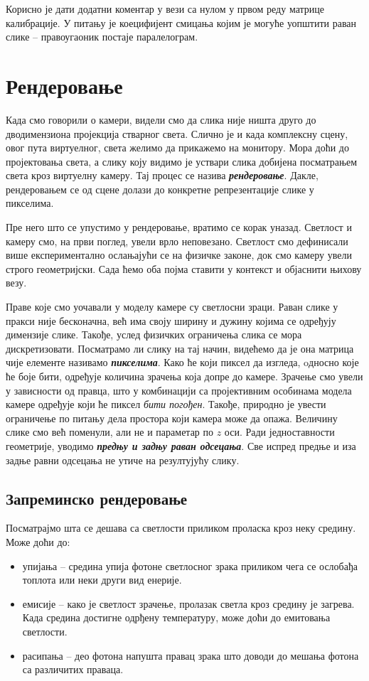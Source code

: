 \documentclass[12pt, a4paper, twoside]{book}
\numberwithin{equation}{chapter}
\numberwithin{theorem}{section}
\numberwithin{definition}{section}
\numberwithin{definitionChapter}{chapter}
\begin{document}
	Корисно је дати додатни коментар у вези са нулом у првом реду матрице калибрације. У питању је коецифијент
	смицања којим је могуће уопштити раван слике -- правоугаоник постаје паралелограм.

\section{Рендеровање}
Када смо говорили о камери, видели смо да слика није ништа друго до дводимензиона пројекција стварног света.
Слично је и када комплексну сцену, овог пута виртуелног, света желимо да прикажемо на монитору. Мора доћи
до пројектовања света, а слику коју видимо је уствари слика добијена посматрањем света кроз виртуелну камеру.
Тај процес се назива \textbf{\textit{рендеровање}}. Дакле, рендеровањем се од сцене долази до конкретне
репрезентације слике у пикселима.

Пре него што се упустимо у рендеровање, вратимо се корак уназад. Светлост и камеру смо, на први поглед, увели
врло неповезано. Светлост смо дефинисали више експериментално ослањајући се на физичке законе, док смо камеру
увели строго геометријски. Сада ћемо оба појма ставити у контекст и објаснити њихову везу.

Праве које смо уочавали у моделу камере су светлосни зраци. Раван слике у пракси није бесконачна, већ има своју
ширину и дужину којима се одређују димензије слике. Такође, услед физичких ограничења слика се мора дискретизовати.
Посматрамо ли слику на тај начин, видећемо да је она матрица чије елементе називамо \textbf{\textit{пикселима}}.
Како ће који пиксел да изгледа, oдносно које ће боје бити, одређује количина зрачења која допре до камере.
Зрачење смо увели у зависности од правца, што у комбинацији са пројективним особинама модела камере одређује
који ће пиксел \textit{бити погођен}. Такође, природно је увести ограничење по питању дела простора који
камера може да опажа. Величину слике смо већ поменули, али не и параметар по $z$ оси. Ради једноставности
геометрије, уводимо \textbf{\textit{предњу и задњу раван одсецања}}. Све испред предње и иза задње равни одсецања
не утиче на резултујућу слику.

\subsection{Запреминско рендеровање}
Посматрајмо шта се дешава са светлости приликом проласка кроз неку средину. Може доћи до:
\begin{itemize}
	\item упијања -- средина упија фотоне светлосног зрака приликом чега се ослобађа топлота
	или неки други вид енерије.
	\item емисије -- како је светлост зрачење, пролазак светла кроз средину је загрева.
	Када средина достигне одрђену температуру, може доћи до емитовања светлости.
	\item расипања -- део фотона напушта правац зрака што доводи до мешања фотона
	са различитих праваца.
\end{itemize}
\end{document}

